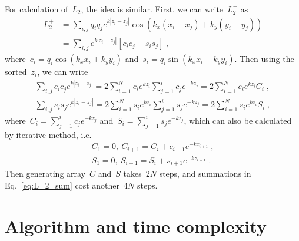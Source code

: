 \documentclass[aps,prl,reprint,showpacs,floatfix,superscriptaddress, onecolumn]{revtex4-2}
\newcommand{\abs}[1]{\left|#1\right|} %
\begin{document}
For calculation of~$L_2$, the idea is similar.
First, we can write~$L_2^+$ as
\begin{equation}
\begin{split}
    L_2^+  & = \sum_{i, j} q_i q_j e^{ k\abs{z_i - z_j}} \cos{(k_x (x_i - x_j) + k_y (y_i - y_j))}\\
    & = \sum_{i, j} e^{ k\abs{z_i - z_j}} \left[ c_i c_j - s_i s_j \right]\;,
\end{split}
\end{equation}
where~$c_i = q_i \cos{(k_x x_i + k_y y _i)}$ and~$s_i = q_i \sin{(k_x x_i + k_y y _i)}$.
Then using the sorted~$z_i$, we can write
\begin{equation}\label{eq:L_2_sum}
    \begin{split}
    \sum_{i, j} c_i c_j e^{ k\abs{z_i - z_j}} = 2 \sum_{i = 1}^{N} c_i e^{k z_i} \sum_{j = 1}^{i} c_j e^{ - k z_j} = 2 \sum_{i = 1}^{N} c_i e^{k z_i} C_i\;,\\
    \sum_{i, j} s_i s_j e^{ k\abs{z_i - z_j}} = 2 \sum_{i = 1}^{N} s_i e^{k z_i} \sum_{j = 1}^{i} s_j e^{ - k z_j} = 2 \sum_{i = 1}^{N} s_i e^{k z_i} S_i\;,
\end{split}
\end{equation}
where~$C_i = \sum_{j = 1}^{i} c_j e^{ - k z_j}$ and~$S_i = \sum_{j = 1}^{i} s_j e^{ - k z_j}$, which can also be calculated by iterative method, i.e.
\begin{align}
    C_1 = 0,~C_{i + 1} = C_i + c_{i + 1} e^{ - k z_{i + 1}}\;, \label{eq:C}\\
    S_1 = 0,~S_{i + 1} = S_i + s_{i + 1} e^{ - k z_{i + 1}}\;. \label{eq:S}
\end{align}
Then generating array~$C$ and~$S$ takes~$2N$ steps, and summations in Eq.~\eqref{eq:L_2_sum} cost another~$4N$ steps.

\section{Algorithm and time complexity}
\end{document}
